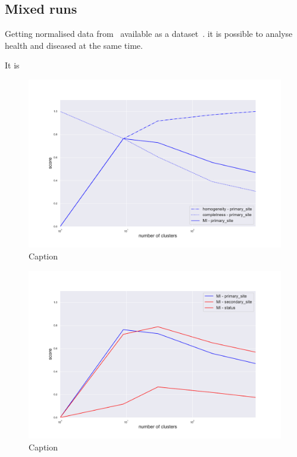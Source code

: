 \subsection{Mixed runs}
Getting normalised data from~\cite{Betel2018} available as a dataset~\cite{Wang2017}. it is possible to analyse health and diseased at the same time.

It is 
\begin{figure}[htb!]
    \centering
    \includegraphics[width=0.8\linewidth]{pictures/topic/merged/metric_scores_primarysite.pdf}
    \caption{Caption}
    \label{fig:topic/merged/metric_scores_primarysite}
\end{figure}

\begin{figure}[htb!]
    \centering
    \includegraphics[width=0.8\linewidth]{pictures/topic/merged/metric_scores.pdf}
    \caption{Caption}
    \label{fig:topic/merged/metric_scores}
\end{figure}


